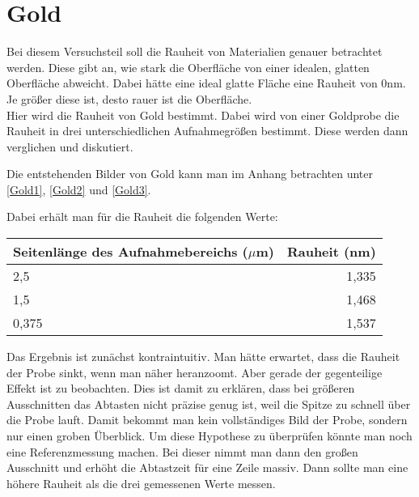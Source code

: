 \section{Gold}

Bei diesem Versuchsteil soll die Rauheit von Materialien genauer betrachtet werden. Diese gibt an, wie stark die Oberfläche von einer idealen, glatten Oberfläche abweicht. 
Dabei hätte eine ideal glatte Fläche eine Rauheit von 0nm. Je größer diese ist, desto rauer ist die Oberfläche.\\

Hier wird die Rauheit von Gold bestimmt. Dabei wird von einer Goldprobe die Rauheit in drei unterschiedlichen 
Aufnahmegrößen bestimmt. Diese werden dann verglichen und diskutiert.

Die entstehenden Bilder von Gold kann man im Anhang betrachten unter \ref{Gold1}, \ref{Gold2} und \ref{Gold3}.

Dabei erhält man für die Rauheit die folgenden Werte:\\
\begin{center}
    \centering
    \begin{tabular}{lr}
        \toprule
        Seitenlänge des Aufnahmebereichs ($\mu$m) & Rauheit (nm)\\
        \midrule
        2,5 & 1,335\\
        1,5 & 1,468 \\
        0,375 & 1,537\\
    \end{tabular}
\end{center}

Das Ergebnis ist zunächst kontraintuitiv. Man hätte erwartet, dass die Rauheit der Probe sinkt, 
wenn man näher heranzoomt. Aber gerade der gegenteilige Effekt ist zu beobachten. Dies ist damit zu erklären, 
dass bei größeren Ausschnitten das Abtasten nicht präzise genug ist, weil 
die Spitze zu schnell über die Probe lauft. Damit bekommt man kein vollständiges Bild der Probe, sondern nur einen groben Überblick. 
Um diese Hypothese zu überprüfen könnte man noch eine Referenzmessung machen. Bei dieser nimmt man dann den großen Ausschnitt und 
erhöht die Abtastzeit für eine Zeile massiv. Dann sollte man eine höhere Rauheit als die 
drei gemessenen Werte messen.